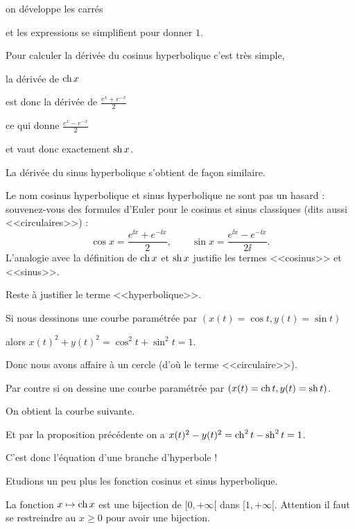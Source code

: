 \change
on développe les carrés

\change
et les expressions se simplifient pour donner $1$.

\change
Pour calculer la dérivée du cosinus hyperbolique c'est très simple,

la dérivée de $\mathop{\mathrm{ch}}\nolimits x$ 

\change
est donc la dérivée de $\frac{e^x+e^{-x}}{2}$

\change
ce qui donne $\frac{e^x-e^{-x}}{2}$

\change
et vaut donc exactement $\mathop{\mathrm{sh}}\nolimits x$.

La dérivée du sinus hyperbolique s'obtient de façon similaire.


\diapo

Le nom cosinus hyperbolique et sinus hyperbolique ne sont pas un hasard :
souvenez-vous des formules d'Euler pour le cosinus et sinus classiques (dits aussi <<circulaires>>) :
$$\cos x = \frac{e^{\ii x} + e^{-\ii x}}{2}, \qquad \sin x = \frac{e^{\ii x} - e^{-\ii x}}{2\ii}.$$
L'analogie avec la définition de $\mathop{\mathrm{ch}}\nolimits x$ et $\mathop{\mathrm{sh}}\nolimits x$ justifie les termes <<cosinus>> et <<sinus>>. 


Reste à justifier le terme <<hyperbolique>>.

\change

\change
Si nous dessinons une courbe paramétrée par 
$(x(t) = \cos t,y(t) = \sin t)$ 

\change
alors
$x(t)^2+y(t)^2 = \cos^2 t + \sin^2 t =1$. 

\change

Donc nous avons affaire à un cercle
(d'où le terme <<circulaire>>). 

\change
Par contre si on dessine une courbe paramétrée 
par $(x(t) = \mathop{\mathrm{ch}}\nolimits t, y(t) = \mathop{\mathrm{sh}}\nolimits t)$.

\change
On obtient la courbe suivante.

\change
Et par la proposition précédente on a 
$x(t)^2 - y(t)^2 = \mathop{\mathrm{ch}}\nolimits^2 t - \mathop{\mathrm{sh}}\nolimits^2 t = 1$.

\change
C'est donc l'équation d'une branche d'hyperbole ! 


\diapo


Etudions un peu plus les fonction cosinus et sinus hyperbolique.


La fonction $x \mapsto \mathop{\mathrm{ch}}\nolimits x$ est une bijection
de $[0,+\infty[$ dans $[1,+\infty[$. 
Attention il faut se restreindre au $x\ge0$ pour avoir une bijection.

